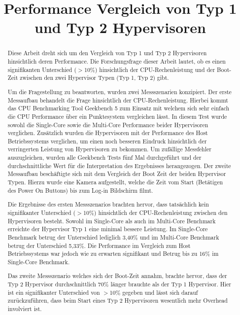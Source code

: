 \documentclass[conference]{IEEEtran}
\begin{document}
\title{Performance Vergleich von Typ 1 und Typ 2 Hypervisoren }

\author
{
}

\maketitle

\begin{abstract}
Diese Arbeit dreht sich um den Vergleich von Typ 1 und Typ 2 Hypervisoren hinsichtlich deren Performance. Die Forschungsfrage dieser Arbeit lautet, ob es einen signifikanten Unterschied ($>$10\%) hinsichtlich der CPU-Rechenleistung und der Boot-Zeit zwischen den zwei Hypervisor Typen (Typ 1, Typ 2) gibt.

Um die Fragestellung zu beantworten, wurden zwei Messszenarien konzipiert. Der erste Messaufbau behandelt die Frage hinsichtlich der CPU-Rechenleistung. Hierbei kommt das CPU Benchmarking Tool Geekbench 5 zum Einsatz mit welchem sich sehr einfach die CPU Performance über ein Punktesystem vergleichen lässt. In diesem Test wurde sowohl die Single-Core sowie die Multi-Core Performance beider Hypervisoren verglichen. Zusätzlich wurden die Hypervisoren mit der Performance des Host Betriebssystems verglichen, um einen noch besseren Eindruck hinsichtlich der verringerten Leistung von Hypervisoren zu bekommen. Um zufällige Messfehler auszugleichen, wurden alle Geekbench Tests fünf Mal durchgeführt und der durchschnittliche Wert für die Interpretation des Ergebnisses herangezogen.
Der zweite Messaufbau beschäftigte sich mit dem Vergleich der Boot Zeit der beiden Hypervisor Typen. Hierzu wurde eine Kamera aufgestellt, welche die Zeit vom Start (Betätigen des Power On Buttons) bis zum Log-in Bildschirm filmt.

Die Ergebnisse des ersten Messszenarios brachten hervor, dass tatsächlich kein signifikanter Unterschied ($>$10\%) hinsichtlich der CPU-Rechenleistung zwischen den Hypervisoren besteht. Sowohl im Single-Core als auch im Multi-Core Benchmark erreichte der Hypervisor Typ 1 eine minimal bessere Leistung. Im Single-Core Benchmark betrug der Unterschied lediglich 3,40\% und im Multi-Core Benchmark betrug der Unterschied 5,33\%. Die Performance im Vergleich zum Host Betriebssystems war jedoch wie zu erwarten signifikant und Betrug bis zu 16\% im Single-Core Benchmark.

Das zweite Messszenario welches sich der Boot-Zeit annahm, brachte hervor, dass der Typ 2 Hypervisor durchschnittlich 70\% länger brauchte als der Typ 1 Hypervisor. Hier ist ein signifikanter Unterschied von $>$10\% gegeben und lässt sich darauf zurückzuführen, dass beim Start eines Typ 2 Hypervisoren wesentlich mehr Overhead involviert ist.

\end{abstract}
\end{document}
